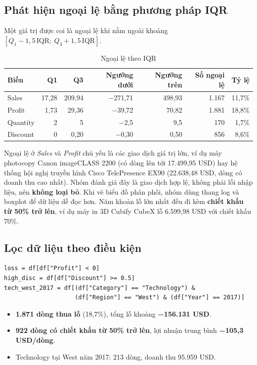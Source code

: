 \documentclass[12pt,a4paper]{article}
\begin{document}
\subsection{Phát hiện ngoại lệ bằng phương pháp IQR}
Một giá trị được coi là ngoại lệ khi nằm ngoài khoảng $[Q_1 - 1{,}5\,\mathrm{IQR};\ Q_3 + 1{,}5\,\mathrm{IQR}]$.
\begin{table}[H]
\centering
\caption{Ngoại lệ theo IQR}\label{tab:iqr}
\begin{tabular}{@{}lrrrrrr@{}}
\toprule
\textbf{Biến} & \textbf{Q1} & \textbf{Q3} & \textbf{Ngưỡng dưới} & \textbf{Ngưỡng trên} & \textbf{Số ngoại lệ} & \textbf{Tỷ lệ} \\
\midrule
Sales    & 17,28 & 209,94 & −271,71 & 498,93 & 1.167 & 11,7\% \\
Profit   & 1,73  & 29,36  & −39,72  & 70,82  & 1.881 & 18,8\% \\
Quantity & 2     & 5      & −2,5    & 9,5    & 170   & 1,7\% \\
Discount & 0     & 0,20   & −0,30   & 0,50   & 856   & 8,6\% \\
\bottomrule
\end{tabular}
\end{table}
Ngoại lệ ở \textit{Sales} và \textit{Profit} chủ yếu là các giao dịch giá trị lớn, ví dụ máy photocopy Canon imageCLASS 2200
(có dòng lên tới 17.499,95 USD) hay hệ thống hội nghị truyền hình Cisco TelePresence EX90 (22.638,48 USD, dòng có doanh thu
cao nhất). Nhóm đánh giá đây là giao dịch hợp lệ, không phải lỗi nhập liệu, nên \textbf{không loại bỏ}. Khi vẽ biểu đồ phân phối, nhóm dùng thang log và boxplot để dữ liệu dễ đọc hơn.
Năm khoản lỗ lớn nhất đều đi kèm \textbf{chiết khấu từ 50\% trở lên}, ví dụ máy in 3D Cubify CubeX
lỗ 6.599,98 USD với chiết khấu 70\%.

\subsection{Lọc dữ liệu theo điều kiện}
\begin{Verbatim}
loss = df[df["Profit"] < 0]
high_disc = df[df["Discount"] >= 0.5]
tech_west_2017 = df[(df["Category"] == "Technology") &
                    (df["Region"] == "West") & (df["Year"] == 2017)]
\end{Verbatim}
\begin{itemize}
  \item \textbf{1.871 dòng thua lỗ} (18,7\%), tổng lỗ khoảng \textbf{−156.131 USD}.
  \item \textbf{922 dòng có chiết khấu từ 50\% trở lên}, lợi nhuận trung bình \textbf{−105,3 USD/dòng}.
  \item Technology tại West năm 2017: 213 dòng, doanh thu 95.959 USD.
\end{itemize}
\end{document}
